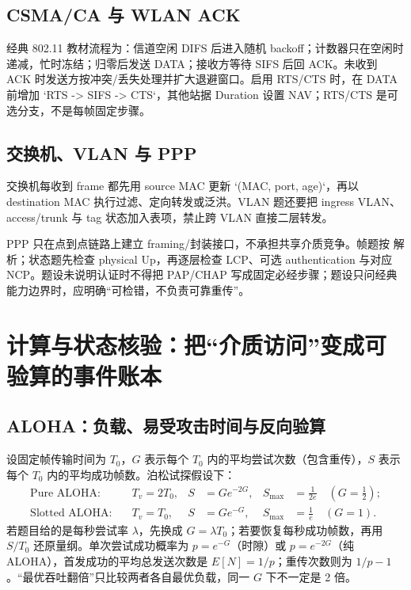 \documentclass[UTF8,fontset=none,11pt,a4paper]{ctexart}
\begin{document}
\subsection{CSMA/CA 与 WLAN ACK}

经典 802.11 教材流程为：信道空闲 DIFS 后进入随机 backoff；计数器只在空闲时递减，忙时冻结；归零后发送 DATA；接收方等待 SIFS 后回 ACK。未收到 ACK 时发送方按冲突/丢失处理并扩大退避窗口。启用 RTS/CTS 时，在 DATA 前增加 `RTS -> SIFS -> CTS`，其他站据 Duration 设置 NAV；RTS/CTS 是可选分支，不是每帧固定步骤。

\subsection{交换机、VLAN 与 PPP}

交换机每收到 frame 都先用 source MAC 更新 `(MAC, port, age)`，再以 destination MAC 执行过滤、定向转发或泛洪。VLAN 题还要把 ingress VLAN、access/trunk 与 tag 状态加入表项，禁止跨 VLAN 直接二层转发。

PPP 只在点到点链路上建立 framing/封装接口，不承担共享介质竞争。帧题按  解析；状态题先检查 physical Up，再逐层检查 LCP、可选 authentication 与对应 NCP。题设未说明认证时不得把 PAP/CHAP 写成固定必经步骤；题设只问经典能力边界时，应明确“可检错，不负责可靠重传”。

\section{计算与状态核验：把“介质访问”变成可验算的事件账本}

\subsection{ALOHA：负载、易受攻击时间与反向验算}

设固定帧传输时间为 $T_0$，$G$ 表示每个 $T_0$ 内的平均尝试次数（包含重传），$S$ 表示每个 $T_0$ 内的平均成功帧数。泊松试探假设下：
\[
\begin{aligned}
\text{Pure ALOHA:}\quad &T_v=2T_0, & S&=G e^{-2G}, & S_{\max}&=\frac1{2e}\quad(G=\tfrac12);\\
\text{Slotted ALOHA:}\quad &T_v=T_0, & S&=G e^{-G}, & S_{\max}&=\frac1e\quad(G=1).
\end{aligned}
\]
若题目给的是每秒尝试率 $\lambda$，先换成 $G=\lambda T_0$；若要恢复每秒成功帧数，再用 $S/T_0$ 还原量纲。单次尝试成功概率为 $p=e^{-G}$（时隙）或 $p=e^{-2G}$（纯 ALOHA），首发成功的平均总发送次数是 $E[N]=1/p$；重传次数则为 $1/p-1$。“最优吞吐翻倍”只比较两者各自最优负载，同一 $G$ 下不一定是 2 倍。
\end{document}
